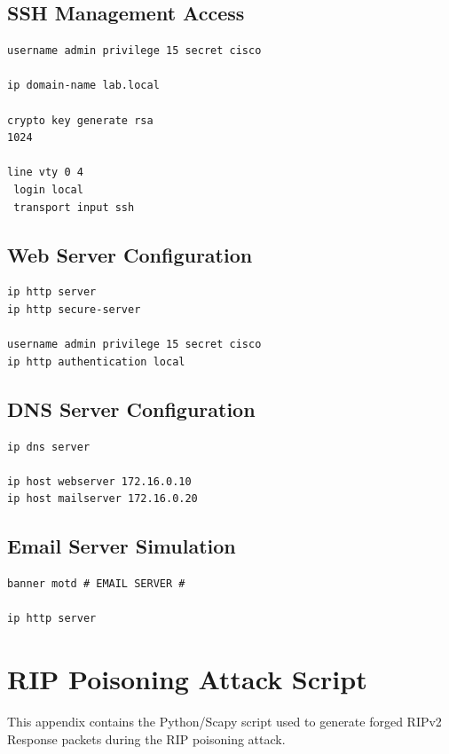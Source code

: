 \documentclass[12pt]{article}
\begin{document}
\subsection{SSH Management Access}

\begin{lstlisting}
username admin privilege 15 secret cisco

ip domain-name lab.local

crypto key generate rsa
1024

line vty 0 4
 login local
 transport input ssh
\end{lstlisting}

\subsection{Web Server Configuration}

\begin{lstlisting}
ip http server
ip http secure-server

username admin privilege 15 secret cisco
ip http authentication local
\end{lstlisting}

\subsection{DNS Server Configuration}

\begin{lstlisting}
ip dns server

ip host webserver 172.16.0.10
ip host mailserver 172.16.0.20
\end{lstlisting}

\subsection{Email Server Simulation}

\begin{lstlisting}
banner motd # EMAIL SERVER #

ip http server
\end{lstlisting}

\section{RIP Poisoning Attack Script}
\label{appendix:rip-script}

This appendix contains the Python/Scapy script used
to generate forged RIPv2 Response packets during
the RIP poisoning attack.
\end{document}
